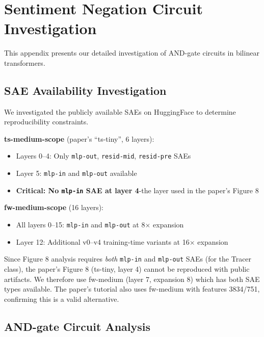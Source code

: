 
\section{Sentiment Negation Circuit Investigation}
\label{app:figure8_investigation}

This appendix presents our detailed investigation of AND-gate circuits in bilinear transformers.

\subsection{SAE Availability Investigation}
\label{app:sae_availability}

We investigated the publicly available SAEs on HuggingFace to determine reproducibility constraints.

\textbf{ts-medium-scope} (paper's ``ts-tiny'', 6 layers):
\begin{itemize}[leftmargin=*,topsep=0pt,itemsep=0pt]
    \item Layers 0--4: Only \texttt{mlp-out}, \texttt{resid-mid}, \texttt{resid-pre} SAEs
    \item Layer 5: \texttt{mlp-in} and \texttt{mlp-out} available
    \item \textbf{Critical: No \texttt{mlp-in} SAE at layer 4}-the layer used in the paper's Figure 8
\end{itemize}

\textbf{fw-medium-scope} (16 layers):
\begin{itemize}[leftmargin=*,topsep=0pt,itemsep=0pt]
    \item All layers 0--15: \texttt{mlp-in} and \texttt{mlp-out} at 8$\times$ expansion
    \item Layer 12: Additional v0--v4 training-time variants at 16$\times$ expansion
\end{itemize}

Since Figure 8 analysis requires \emph{both} \texttt{mlp-in} and \texttt{mlp-out} SAEs (for the Tracer class), the paper's Figure 8 (ts-tiny, layer 4) cannot be reproduced with public artifacts.
We therefore use fw-medium (layer 7, expansion 8) which has both SAE types available.
The paper's tutorial also uses fw-medium with features 3834/751, confirming this is a valid alternative.

\subsection{AND-gate Circuit Analysis}

